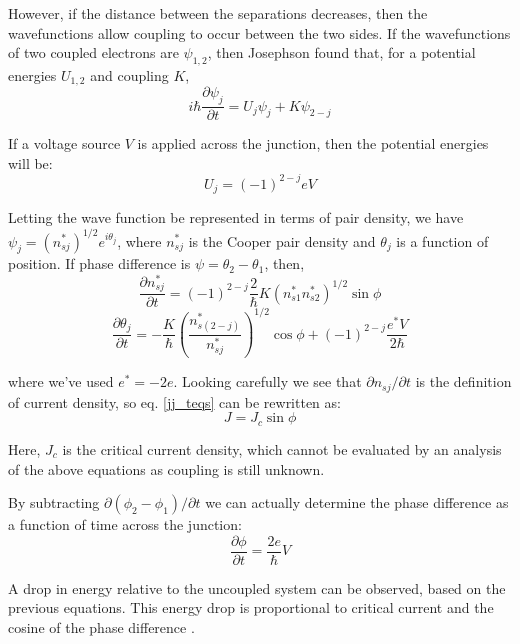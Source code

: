 \documentclass[letterpaper,english,reprint, aps]{revtex4}
\begin{document}
However, if the distance between the separations decreases, then the wavefunctions allow coupling to occur between the two sides. If the wavefunctions of two coupled electrons are $\psi_{1,2}$, then Josephson found that, for a potential energies $U_{1,2}$ and coupling $K$,
\begin{equation}
    i\hbar \frac{\partial \psi_j}{\partial t} = U_j\psi_j + K\psi_{2-j}
\end{equation}

If a voltage source $V$ is applied across the junction, then the potential energies will be:
\begin{equation}
    U_j = (-1)^{2-j}eV
\end{equation}

Letting the wave function be represented in terms of pair density, we have $\psi_j = (n_{sj}^*)^{1/2}e^{i\theta_j}$, where $n_{sj}^*$ is the Cooper pair density and $\theta_j$ is a function of position. If phase difference is $\psi = \theta_2 - \theta_1$, then,
\begin{equation}
    \label{jj_teqs}
    \frac{\partial n_{sj}^*}{\partial t} = (-1)^{2-j}\frac{2}{\hbar}K(n_{s1}^*n_{s2}^*)^{1/2}\sin\phi
\end{equation}
\begin{equation}
    \frac{\partial \theta_j}{\partial t} = -\frac{K}{\hbar}\left(\frac{n_{s(2-j)}^*}{n_{sj}^*}\right)^{1/2}\cos\phi + (-1)^{2-j}\frac{e^*V}{2\hbar}
\end{equation}

where we've used $e^* = -2e$. Looking carefully we see that $\partial n_{sj}/\partial t$ is the definition of current density, so eq. \ref{jj_teqs} can be rewritten as:
\begin{equation}
    J = J_c\sin\phi
\end{equation}

Here, $J_c$ is the critical current density, which cannot be evaluated by an analysis of the above equations as coupling is still unknown.

By subtracting $\partial(\phi_2-\phi_1)/\partial t$ we can actually determine the phase difference as a function of time across the junction:
\begin{equation}
    \frac{\partial\phi}{\partial t} = \frac{2e}{\hbar}V
\end{equation}

A drop in energy relative to the uncoupled system can be observed, based on the previous equations. This energy drop is proportional to critical current and the cosine of the phase difference \citep{josephson,josephson_ieee,vanduzer}.
\end{document}

